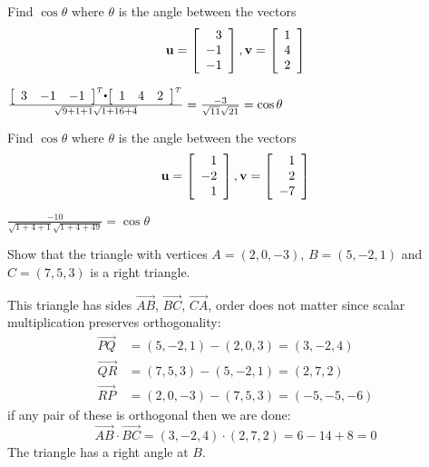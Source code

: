 \begin{enumialphparenastyle}

\begin{ex} Find $\cos \theta$ where $\theta$ is the angle between the vectors 
\begin{equation*}
{\bf u}
=
\left[
\begin{array}{r}
3 \\
-1 \\
-1
\end{array}
\right],
{\bf v}
=
\left[
\begin{array}{r}
1 \\
4 \\
2
\end{array}
\right]
\end{equation*}
\begin{sol}
 $\frac{\leftB \begin{array}{ccc} 
3 & -1 & -1
\end{array}
\rightB^T \dotprod
\leftB \begin{array}{ccc}
1 & 4 & 2
\end{array}
\rightB^T }{\sqrt{9+1+1}\sqrt{1+16+4}}= \frac{-3}{\sqrt{11}\sqrt{21}}= \cos \theta $ 
\end{sol}
\end{ex}

\begin{ex} Find $\cos \theta$ where $\theta$ is the angle between the vectors  
\begin{equation*}
{\bf u}
=
\left[
\begin{array}{r}
1 \\
-2 \\
1
\end{array}
\right],
{\bf v}
=
\left[
\begin{array}{r}
1 \\
2 \\
-7
\end{array}
\right]
\end{equation*}
\begin{sol}
 $\frac{-10}{\sqrt{1+4+1}\sqrt{1+4+49}}=\cos \theta $ 

\end{sol}
\end{ex}

\begin{ex} Show that the triangle with vertices $A=(2,0,-3)$, $B=(5,-2,1)$ and $C=(7,5,3)$ is a right triangle. 
\begin{sol}

This triangle has sides $\overrightarrow{AB}$, $\overrightarrow{BC}$, $\overrightarrow{CA}$, order does not matter since scalar multiplication preserves orthogonality:
\begin{align*}
\overrightarrow{PQ}&=(5,-2,1)-(2,0,3)=(3,-2,4)\\
\overrightarrow{QR}&=(7,5,3)-(5,-2,1)=(2,7,2)\\
\overrightarrow{RP}&=(2,0,-3)-(7,5,3)=(-5,-5,-6)
\end{align*}
if any pair of these is orthogonal then we are done:
$$\overrightarrow{AB}\cdot\overrightarrow{BC}=(3,-2,4)\cdot (2,7,2)=6-14+8=0$$
The triangle has a right angle at $B$.



\end{sol}
\end{ex}
\end{enumialphparenastyle}

